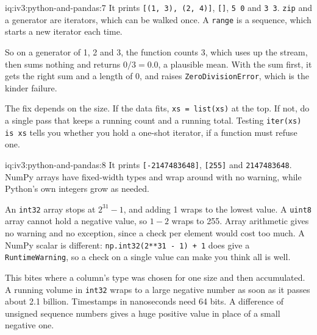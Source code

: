 \begin{solution}{iq:iv3:python-and-pandas:7}
It prints \texttt{[(1, 3), (2, 4)]}, \texttt{[]}, \texttt{5 0} and \texttt{3 3}. \texttt{zip} and a generator are iterators, which can be walked once. A \texttt{range} is a sequence, which starts a new iterator each time.

So on a generator of 1, 2 and 3, the function counts 3, which uses up the stream, then sums nothing and returns $0 / 3 = 0.0$, a plausible mean. With the sum first, it gets the right sum and a length of 0, and raises \texttt{ZeroDivisionError}, which is the kinder failure.

The fix depends on the size. If the data fits, \texttt{xs = list(xs)} at the top. If not, do a single pass that keeps a running count and a running total. Testing \texttt{iter(xs) is xs} tells you whether you hold a one-shot iterator, if a function must refuse one.

\end{solution}

\begin{solution}{iq:iv3:python-and-pandas:8}
It prints \texttt{[-2147483648]}, \texttt{[255]} and \texttt{2147483648}. NumPy arrays have fixed-width types and wrap around with no warning, while Python's own integers grow as needed.

An \texttt{int32} array stops at $2^{31} - 1$, and adding 1 wraps to the lowest value. A \texttt{uint8} array cannot hold a negative value, so $1 - 2$ wraps to 255. Array arithmetic gives no warning and no exception, since a check per element would cost too much. A NumPy scalar is different: \texttt{np.int32(2**31 - 1) + 1} does give a \texttt{RuntimeWarning}, so a check on a single value can make you think all is well.

This bites where a column's type was chosen for one size and then accumulated. A running volume in \texttt{int32} wraps to a large negative number as soon as it passes about 2.1 billion. Timestamps in nanoseconds need 64 bits. A difference of unsigned sequence numbers gives a huge positive value in place of a small negative one.

\end{solution}

